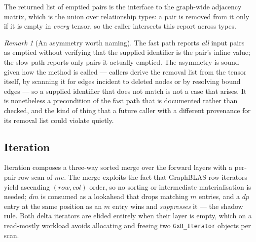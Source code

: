 \documentclass[11pt,a4paper]{article}
\theoremstyle{plain}
\theoremstyle{definition}
\theoremstyle{remark}
\newtheorem{remark}[theorem]{Remark}
\begin{document}
The returned list of emptied pairs is the interface to the graph-wide
adjacency matrix, which is the union over relationship types: a pair is
removed from it only if it is empty in \emph{every} tensor, so the caller
intersects this report across types.

\begin{remark}[An asymmetry worth naming]
The fast path reports \emph{all} input pairs as emptied without verifying
that the supplied identifier is the pair's inline value; the slow path
reports only pairs it actually emptied. The asymmetry is sound given how the
method is called --- callers derive the removal list from the tensor itself,
by scanning it for edges incident to deleted nodes or by resolving bound
edges --- so a supplied identifier that does not match is not a case that
arises. It is nonetheless a precondition of the fast path that is documented
rather than checked, and the kind of thing that a future caller with a
different provenance for its removal list could violate quietly.
\end{remark}

\subsection{Iteration}
\label{sec:iter}

Iteration composes a three-way sorted merge over the forward layers with a
per-pair row scan of $me$. The merge exploits the fact that GraphBLAS row
iterators yield ascending $(\mathit{row}, \mathit{col})$ order, so no sorting
or intermediate materialisation is needed; $dm$ is consumed as a lookahead
that drops matching $m$ entries, and a $dp$ entry at the same position as an
$m$ entry wins and \emph{suppresses} it --- the shadow rule. Both delta
iterators are elided entirely when their layer is empty, which on a
read-mostly workload avoids allocating and freeing two \texttt{GxB\_Iterator}
objects per scan.
\end{document}
